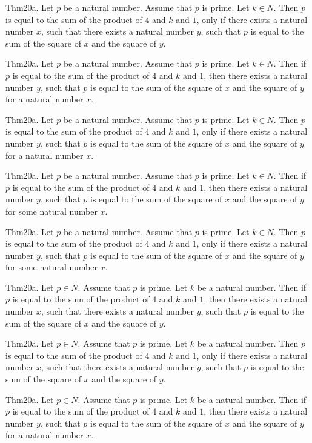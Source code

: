 \documentclass{article}
\begin{document}
Thm20a. Let $p$ be a natural number. Assume that $p$ is prime. Let $k \in N$. Then $p$ is equal to the sum of the product of $4$ and $k$ and $1$, only if there exists a natural number $x$, such that there exists a natural number $y$, such that $p$ is equal to the sum of the square of $x$ and the square of $y$.

Thm20a. Let $p$ be a natural number. Assume that $p$ is prime. Let $k \in N$. Then if $p$ is equal to the sum of the product of $4$ and $k$ and $1$, then there exists a natural number $y$, such that $p$ is equal to the sum of the square of $x$ and the square of $y$ for a natural number $x$.

Thm20a. Let $p$ be a natural number. Assume that $p$ is prime. Let $k \in N$. Then $p$ is equal to the sum of the product of $4$ and $k$ and $1$, only if there exists a natural number $y$, such that $p$ is equal to the sum of the square of $x$ and the square of $y$ for a natural number $x$.

Thm20a. Let $p$ be a natural number. Assume that $p$ is prime. Let $k \in N$. Then if $p$ is equal to the sum of the product of $4$ and $k$ and $1$, then there exists a natural number $y$, such that $p$ is equal to the sum of the square of $x$ and the square of $y$ for some natural number $x$.

Thm20a. Let $p$ be a natural number. Assume that $p$ is prime. Let $k \in N$. Then $p$ is equal to the sum of the product of $4$ and $k$ and $1$, only if there exists a natural number $y$, such that $p$ is equal to the sum of the square of $x$ and the square of $y$ for some natural number $x$.

Thm20a. Let $p \in N$. Assume that $p$ is prime. Let $k$ be a natural number. Then if $p$ is equal to the sum of the product of $4$ and $k$ and $1$, then there exists a natural number $x$, such that there exists a natural number $y$, such that $p$ is equal to the sum of the square of $x$ and the square of $y$.

Thm20a. Let $p \in N$. Assume that $p$ is prime. Let $k$ be a natural number. Then $p$ is equal to the sum of the product of $4$ and $k$ and $1$, only if there exists a natural number $x$, such that there exists a natural number $y$, such that $p$ is equal to the sum of the square of $x$ and the square of $y$.

Thm20a. Let $p \in N$. Assume that $p$ is prime. Let $k$ be a natural number. Then if $p$ is equal to the sum of the product of $4$ and $k$ and $1$, then there exists a natural number $y$, such that $p$ is equal to the sum of the square of $x$ and the square of $y$ for a natural number $x$.
\end{document}
